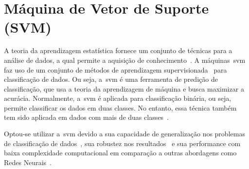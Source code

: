 \section{Máquina de Vetor de Suporte (SVM)}\label{sec:svm_linear}
A teoria da aprendizagem estatística fornece um conjunto de técnicas para a análise de dados, a qual permite a aquisição de conhecimento~\cite{vapnik95}. A máquinas~\ac{svm} faz uso de um conjunto de métodos de aprendizagem supervisionada~\cite{datamining2005} para classificação de dados. Ou seja, a~\ac{svm} é uma ferramenta de predição de classificação, que usa a teoria da aprendizagem de máquina e busca maximizar a acurácia. Normalmente, a~\ac{svm} é aplicada para classificação binária, ou seja, permite classificar os dados em duas classes. No entanto, essa técnica também tem sido aplicada em dados com mais de duas classes~\cite{multisvm2011}.

Optou-se utilizar a~\ac{svm} devido a sua capacidade de generalização nos problemas de classificação de dados~\cite{vapnik95,xusvm2009}, sua robustez nos resultados~\cite{xusvm2009} e sua performance com baixa complexidade computacional em comparação a outras abordagens como Redes Neurais~\cite{comprnasvm2007}.


%

%
%



